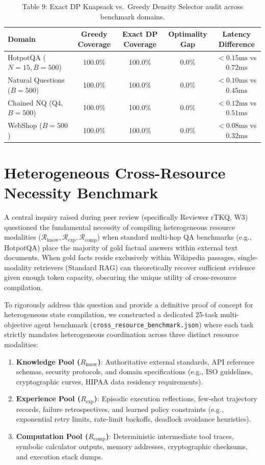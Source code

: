 \documentclass{article}
\begin{document}
\begin{table}[h]
\caption{Table 9: Exact DP Knapsack vs.\ Greedy Density Selector audit across benchmark domains.}
\centering
\begin{tabular}{lcccc}
\toprule
Domain & Greedy Coverage & Exact DP Coverage & Optimality Gap & Latency Difference \\
\midrule
HotpotQA ($N{=}15, B{=}500$) & 100.0\% & 100.0\% & 0.0\% & $< 0.15\text{ms}$ vs $0.72\text{ms}$ \\
Natural Questions ($B{=}500$) & 100.0\% & 100.0\% & 0.0\% & $< 0.10\text{ms}$ vs $0.45\text{ms}$ \\
Chained NQ (Q4, $B{=}500$) & 100.0\% & 100.0\% & 0.0\% & $< 0.12\text{ms}$ vs $0.51\text{ms}$ \\
WebShop ($B{=}500$) & 100.0\% & 100.0\% & 0.0\% & $< 0.08\text{ms}$ vs $0.32\text{ms}$ \\
\bottomrule
\end{tabular}
\end{table}

\clearpage
\section{Heterogeneous Cross-Resource Necessity Benchmark}
\label{app:cross_resource}

A central inquiry raised during peer review (specifically Reviewer rTKQ, W3) questioned the fundamental necessity of compiling heterogeneous resource modalities ($\mathcal{R}_{\text{know}}, \mathcal{R}_{\text{exp}}, \mathcal{R}_{\text{comp}}$) when standard multi-hop QA benchmarks (e.g., HotpotQA) place the majority of gold factual answers within external text documents. When gold facts reside exclusively within Wikipedia passages, single-modality retrievers (Standard RAG) can theoretically recover sufficient evidence given enough token capacity, obscuring the unique utility of cross-resource compilation.

To rigorously address this question and provide a definitive proof of concept for heterogeneous state compilation, we constructed a dedicated 25-task multi-objective agent benchmark (\texttt{cross\_resource\_benchmark.json}) where each task strictly mandates heterogeneous coordination across three distinct resource modalities:
\begin{enumerate}
    \item \textbf{Knowledge Pool ($R_{\text{know}}$)}: Authoritative external standards, API reference schemas, security protocols, and domain specifications (e.g., ISO guidelines, cryptographic curves, HIPAA data residency requirements).
    \item \textbf{Experience Pool ($R_{\text{exp}}$)}: Episodic execution reflections, few-shot trajectory records, failure retrospectives, and learned policy constraints (e.g., exponential retry limits, rate-limit backoffs, deadlock avoidance heuristics).
    \item \textbf{Computation Pool ($R_{\text{comp}}$)}: Deterministic intermediate tool traces, symbolic calculator outputs, memory addresses, cryptographic checksums, and execution stack dumps.
\end{enumerate}
\end{document}
